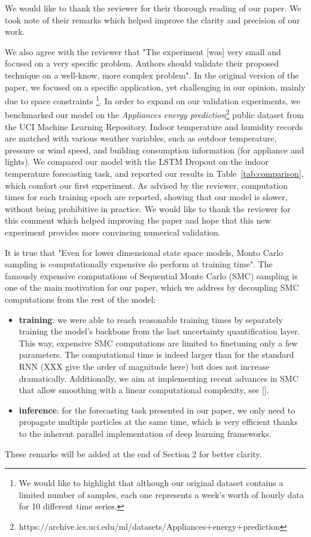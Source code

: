 \documentclass{article}
\title{}
\author{}
\date{}
\begin{document}
\maketitle

We would like to thank the reviewer for their thorough reading of our paper.
We took note of their remarks which helped improve the clarity and precision of our work.

We also agree with the reviewer that "The experiment [was] very small and focused on a very specific problem. Authors should validate their proposed technique on a well-know, more complex problem".
In the original version of the paper, we focused on a specific application, yet challenging in our opinion, mainly due to space constraints \footnote{We would like to highlight that although our original dataset contains a limited number of samples, each one represents a week's worth of hourly data for 10 different time series.}.
In order to expand on our validation experiments, we benchmarked our model on the \textit{Appliances energy prediction}\footnote{https://archive.ics.uci.edu/ml/datasets/Appliances+energy+prediction} public dataset from the UCI Machine Learning Repository.
Indoor temperature and humidity records are matched with various weather variables, such as outdoor temperature, pressure or wind speed, and building consumption information (for appliance and lights).
We compared our model with the LSTM Dropout on the indoor temperature forecasting task, and reported our results in Table~\ref{tab:comparison}, which comfort our first experiment.
As advised by the reviewer, computation times for each training epoch are reported, showing that our model is slower, without being prohibitive in practice.
We would like to thank the reviewer for this comment which helped improving the paper and hope that this new experiment provides more convincing numerical validation.

It is true that "Even for lower dimensional state space models, Monto Carlo sampling is computationally expensive do perform at training time".
The famously expensive computations of Sequential Monte Carlo (SMC) sampling is one of the main motivation for our paper, which we address by decoupling SMC computations from the rest of the model:
\begin{itemize}
	\item \textbf{training}: we were able to reach reasonable training times by separately training the model's backbone from the last uncertainty quantification layer.
	      This way, expensive SMC computations are limited to finetuning only a few parameters.
	      The computational time is indeed larger than for the standard RNN (XXX give the order of magnitude here) but does not increase dramatically.
	      Additionally, we aim at implementing recent advances in SMC that allow smoothing with a linear computational complexity, see [].
	\item \textbf{inference}: for the forecasting task presented in our paper, we only need to propagate multiple particles at the same time, which is very efficient thanks to the inherent parallel implementation of deep learning frameworks.
\end{itemize}
These remarks will be added at the end of Section 2 for better clarity.
\end{document}
